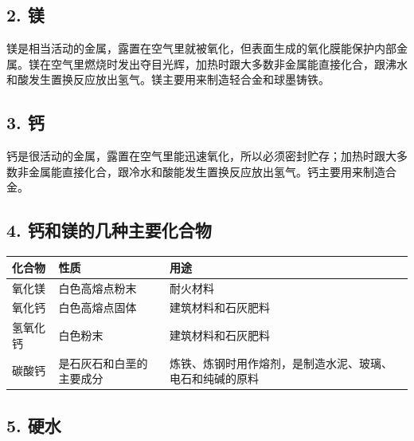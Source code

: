\subsection{2. 镁}

镁是相当活动的金属，露置在空气里就被氧化，但表面生成的氧化膜能保护内部金属。镁在空气里燃烧时发出夺目光辉，加热时跟大多数非金属能直接化合，跟沸水和酸发生置换反应放出氢气。镁主要用来制造轻合金和球墨铸铁。

\subsection{3. 钙}

钙是很活动的金属，露置在空气里能迅速氧化，所以必须密封贮存；加热时跟大多数非金属能直接化合，跟冷水和酸能发生置换反应放出氢气。钙主要用来制造合金。

\subsection{4. 钙和镁的几种主要化合物}

{\def\LTcaptype{none} %
\begin{longtable}[]{@{}
  >{\raggedright\arraybackslash}p{}
  >{\raggedright\arraybackslash}p{}
  >{\raggedright\arraybackslash}p{}@{}}
\toprule\noalign{}
\begin{minipage}[b]{\linewidth}\raggedright
化合物
\end{minipage} & \begin{minipage}[b]{\linewidth}\raggedright
性质
\end{minipage} & \begin{minipage}[b]{\linewidth}\raggedright
用途
\end{minipage} \\
\midrule\noalign{}
\endhead
\bottomrule\noalign{}
\endlastfoot
氧化镁 & 白色高熔点粉末 & 耐火材料 \\
氧化钙 & 白色高熔点固体 & 建筑材料和石灰肥料 \\
氢氧化钙 & 白色粉末 & 建筑材料和石灰肥料 \\
碳酸钙 & 是石灰石和白垩的主要成分 &
炼铁、炼钢时用作熔剂，是制造水泥、玻璃、电石和纯碱的原料 \\
\end{longtable}
}

\subsection{5. 硬水}

